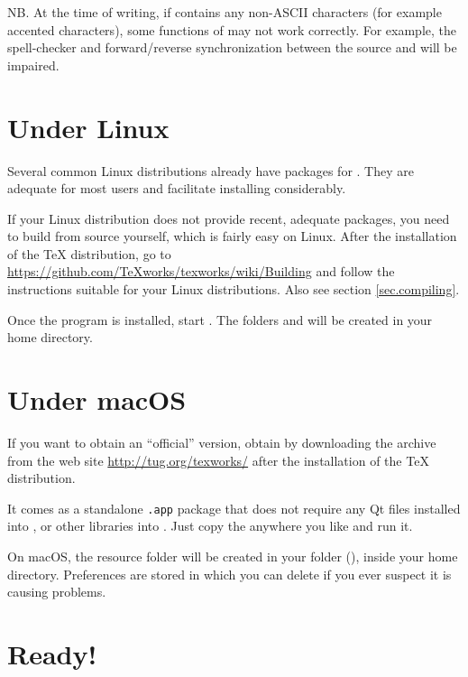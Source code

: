 NB. At the time of writing, if  contains any non-ASCII characters (for example accented characters), some functions of {\Tw} may not work correctly. For example, the spell-checker and forward/reverse synchronization between the source and  will be impaired.

\section{Under Linux}

Several common Linux distributions already have packages for {\Tw}. They are adequate for most users and facilitate installing {\Tw} considerably.

If your Linux distribution does not provide recent, adequate packages, you need to build {\Tw} from source yourself, which is fairly easy on Linux. After the installation of the {\TeX} distribution, go to \url{https://github.com/TeXworks/texworks/wiki/Building} and follow the instructions suitable for your Linux distributions. Also see section \ref{sec.compiling}.

Once the program is installed, start {\Tw}. The folders  and  will be created in your home directory.

\section{Under macOS}

If you want to obtain an ``official'' version, obtain {\Tw} by downloading the archive from the {\Tw} web site \url{http://tug.org/texworks/} after the installation of the {\TeX} distribution.

It comes as a standalone \texttt{.app} package that does not require any Qt files installed into , or other libraries into . Just copy the  anywhere you like and run it.

On macOS, the {\Tw} resource folder will be created in your  folder (), inside your home directory. Preferences are stored in 
which you can delete if you ever suspect it is causing problems.

\section{Ready!}

